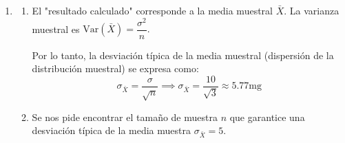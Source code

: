 \begin{enumerate}[label=\color{red}\textbf{\arabic*)}]
\begin{enumerate}[label=\color{red}\textbf{\alph*)}]
		            Sea una muestra aleatoria simple de tamaño $n=6$. Buscamos calcular la probabilidad sobre la media muestra: $P(\bar{X}_6<295)$.

		            Por el \textbf{Teorema de Fisher}, dado que la población original es Normal, la distribución exacta de la media muestral viene dada por: \[
			            \begin{array}{c}
				            \bar{X}_n\sim \mathcal{N}\left( \mu,\dfrac{\sigma^2}{n} \right) \\
				            \bar{X}_6\sim \mathcal{N}\left( 298, \dfrac{9}{6} \right) \implies \bar{X}_6\sim \mathcal{N}(298,1.5)
			            \end{array}
		            \]
		            Aplicamos la estandarización del estadístico media muestral definida en el mismo teorema: \[
			            Z=\dfrac{\bar{X}-\mu}{\sigma / \sqrt{n} }\sim \mathcal{N}(0,1)
		            \]
		            Sustituyendo para nuestro umbral de 295 ml: \[
			            Z=\dfrac{295-298}{3 / \sqrt{6} }=\dfrac{-3}{3 / \sqrt{6} }=-\sqrt{6}\approx -2.449
		            \]
		            Por lo tanto, la probabilidad de la media muestral es: \[
			            P(\bar{X}_6<295)=P(Z<-2.449)\approx 0.0071
		            \]
	      \end{enumerate}
	\item {}
	      \begin{enumerate}[label=\color{red}\textbf{\alph*)}]
		      \item {}

		            El "resultado calculado" corresponde a la media muestral $\bar{X}$. La varianza muestral es $\mathrm{Var}(\bar{X})=\dfrac{\sigma^2}{n}. $

		            Por lo tanto, la desviación típica de la media muestral (dispersión de la distribución muestral) se expresa como: \[
			            \sigma_{\bar{X}}=\dfrac{\sigma}{\sqrt{n} }\implies \sigma_{\bar{X}}=\dfrac{10}{\sqrt{3} }\approx 5.77\mathrm{mg}
		            \]
		      \item {}

		            Se nos pide encontrar el tamaño de muestra $n$ que garantice una desviación típica de la media muestra $\sigma_{\bar{X}}=5$.


\end{enumerate}
\end{enumerate}
